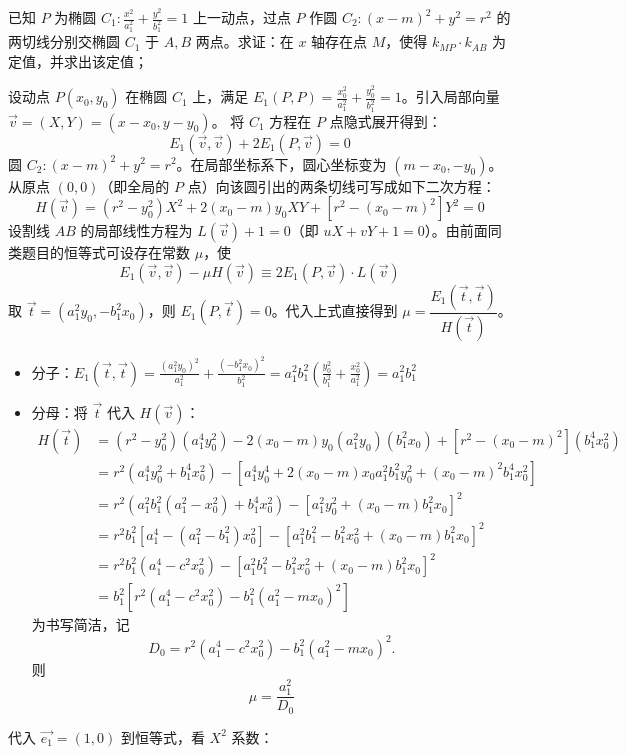\begin{exercise}
    已知 $P$ 为椭圆 $C_1: \frac{x^2}{a_1^2} + \frac{y^2}{b_1^2} = 1$ 上一动点，过点 $P$ 作圆 $C_2: (x - m)^2 + y^2 = r^2$ 的两切线分别交椭圆 $C_1$ 于 $A, B$ 两点。求证：在 $x$ 轴存在点 $M$，使得 $k_{MP} \cdot k_{AB}$ 为定值，并求出该定值；
\end{exercise}
\begin{solution}
设动点 $P(x_0, y_0)$ 在椭圆 $C_1$ 上，满足 $E_1(P,P) = \frac{x_0^2}{a_1^2} + \frac{y_0^2}{b_1^2} = 1$。引入局部向量 $\vec{v} = (X,Y) = (x-x_0, y-y_0)$。
将 $C_1$ 方程在 $P$ 点隐式展开得到：$$E_1(\vec{v}, \vec{v}) + 2E_1(P, \vec{v}) = 0$$
圆 $C_2: (x-m)^2 + y^2 = r^2$。在局部坐标系下，圆心坐标变为 $(m-x_0, -y_0)$。从原点 $(0,0)$（即全局的 $P$ 点）向该圆引出的两条切线可写成如下二次方程：
$$H(\vec{v}) = (r^2 - y_0^2)X^2 + 2(x_0-m)y_0 XY + [r^2 - (x_0-m)^2]Y^2 = 0$$
设割线 $AB$ 的局部线性方程为 $L(\vec{v}) + 1 = 0$（即 $uX+vY+1=0$）。由前面同类题目的恒等式可设存在常数 $\mu$，使
$$E_1(\vec{v}, \vec{v}) - \mu H(\vec{v}) \equiv 2E_1(P, \vec{v}) \cdot L(\vec{v})$$
取 $\vec{t} = (a_1^2 y_0, -b_1^2 x_0)$，则 $E_1(P, \vec{t}) = 0$。代入上式直接得到 $\mu = \dfrac{E_1(\vec{t}, \vec{t})}{H(\vec{t})}$。
\begin{itemize}
\item 分子：$E_1(\vec{t}, \vec{t}) = \frac{(a_1^2 y_0)^2}{a_1^2} + \frac{(-b_1^2 x_0)^2}{b_1^2} = a_1^2 b_1^2 \left( \frac{y_0^2}{b_1^2} + \frac{x_0^2}{a_1^2} \right) = {a_1^2 b_1^2}$
\item 分母：将 $\vec{t}$ 代入 $H(\vec{v})$：
\begin{align*}
H(\vec{t}) &= (r^2 - y_0^2)(a_1^4 y_0^2) - 2(x_0-m)y_0(a_1^2 y_0)(b_1^2 x_0) + [r^2 - (x_0-m)^2](b_1^4 x_0^2)\\
&= r^2(a_1^4 y_0^2 + b_1^4 x_0^2)- [a_1^4 y_0^4 + 2(x_0-m)x_0 a_1^2 b_1^2 y_0^2 + (x_0-m)^2 b_1^4 x_0^2]\\
&= r^2(a_1^2 b_1^2(a_1^2 - x_0^2) + b_1^4 x_0^2)  - [a_1^2 y_0^2 + (x_0-m)b_1^2 x_0]^2\\
&= r^2 b_1^2 [a_1^4 - (a_1^2 - b_1^2)x_0^2] - [a_1^2 b_1^2-b_1^2 x_0^2 + (x_0-m)b_1^2 x_0]^2\\
&= r^2 b_1^2 (a_1^4 - c^2 x_0^2)- [a_1^2 b_1^2-b_1^2 x_0^2 + (x_0-m)b_1^2 x_0]^2\\
&= b_1^2 [r^2(a_1^4 - c^2 x_0^2) - b_1^2(a_1^2 - m x_0)^2]
\end{align*}
为书写简洁，记
$$D_0 = r^2(a_1^4 - c^2 x_0^2) - b_1^2(a_1^2 - m x_0)^2.$$
则
$$\mu = \frac{a_1^2}{D_0}$$
\end{itemize}
代入 $\vec{e_1} = (1,0)$ 到恒等式，看 $X^2$ 系数：

\end{solution}
